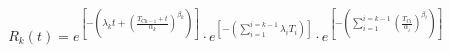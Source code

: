 \documentclass{article}
\begin{document}
\begin{equation}\label{eq:regression}
\begin{split}R_{k}\left( t \right) = e^{\left\lbrack - \left( \lambda_{k}t + \left( \frac{T_{\text{Ck} - 1} + t}{\alpha_{k}} \right)^{\beta_{k}} \right) \right\rbrack} \cdot e^{\left\lbrack - \left( \sum_{i = 1}^{i = k - 1}{\lambda_{i}T_{i}} \right) \right\rbrack} \cdot e^{\left\lbrack - \left( \sum_{i = 1}^{i = k - 1}\left( \frac{T_{\text{Ci}}}{\alpha_{i}} \right)^{\beta_{i}} \right) \right\rbrack}\end{split}
\end{equation}
\end{document}
